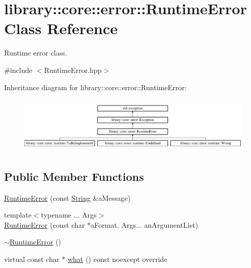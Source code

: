 \hypertarget{classlibrary_1_1core_1_1error_1_1_runtime_error}{}\section{library\+::core\+::error\+::Runtime\+Error Class Reference}
\label{classlibrary_1_1core_1_1error_1_1_runtime_error}


Runtime error class.  




{\ttfamily \#include $<$Runtime\+Error.\+hpp$>$}

Inheritance diagram for library\+::core\+::error\+::Runtime\+Error\+:\begin{figure}[H]
\begin{center}
\leavevmode
\includegraphics[height=2.715152cm]{classlibrary_1_1core_1_1error_1_1_runtime_error}
\end{center}
\end{figure}
\subsection*{Public Member Functions}
\begin{DoxyCompactItemize}
\item 
\mbox{\hyperlink{classlibrary_1_1core_1_1error_1_1_runtime_error_a6ba0ac577d200ad5f83843ecbe775c2f}{Runtime\+Error}} (const \mbox{\hyperlink{classlibrary_1_1core_1_1types_1_1_string}{String}} \&a\+Message)
\item 
{\footnotesize template$<$typename ... Args$>$ }\\\mbox{\hyperlink{classlibrary_1_1core_1_1error_1_1_runtime_error_a4ac1bac63f4c46fe10e7c96d545c6e4a}{Runtime\+Error}} (const char $\ast$a\+Format, Args... an\+Argument\+List)
\item 
\mbox{\hyperlink{classlibrary_1_1core_1_1error_1_1_runtime_error_ab66a0df8767bf53b9910a15960622c0d}{$\sim$\+Runtime\+Error}} ()
\item 
virtual const char $\ast$ \mbox{\hyperlink{classlibrary_1_1core_1_1error_1_1_runtime_error_af3da31cf67f3f5e120c5db9072e3a801}{what}} () const noexcept override
\end{DoxyCompactItemize}


